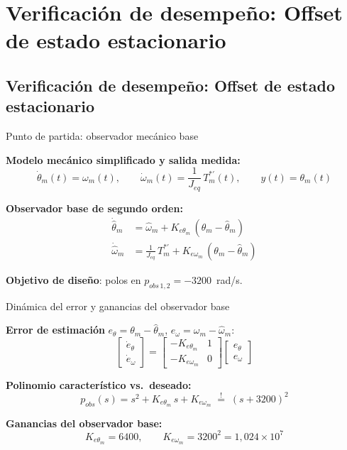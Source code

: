 \documentclass[aspectratio=169,t]{beamer}
\newcommand{\SecPresentacion}{Presentación del problema}
\newcommand{\SecMecanico}{Subsistema mecánico equivalente}
\newcommand{\SecElectromagnetico}{Subsistema electromagnético en coordenadas qd0}
\newcommand{\SecTermico}{Subsistema térmico}
\newcommand{\SecNLGlobal}{Sistema No Lineal Global}
\newcommand{\SecLPV}{Linealización Jacobiana (LPV)}
\newcommand{\SecLTI}{Obtención del modelo LTI equivalente}
\newcommand{\SecAnalisisLTI}{Análisis del modelo LTI aumentado}
\newcommand{\SecDinamica}{Respuesta dinámica en dominio del tiempo}
\newcommand{\SecControlador}{Diseño y análisis del controlador en cascada}
\newcommand{\SecVerifSpecs}{Verificación de desempeño: Especificaciones de operación}
\newcommand{\SecVerifOffset}{Verificación de desempeño: Offset de estado estacionario}
\newcommand{\SecVerifNoIdealidades}{Verificación de desempeño: No idealidades y comportamiento térmico}
\newcommand{\SecDiscretizacion}{Discretización del controlador}
\newcommand{\SecSoftware}{Codificación del software de control}
\newcommand{\AgendaItem}[3]{%
  \ifnum#1=#2
    {\scriptsize\bfseries\color{uncBlue}%
      \hyperlink{sec:#1}{\makebox[2.2em][r]{#1.}\hspace{0.7em}%
      \parbox[t]{0.86\textwidth}{#3}}\par}%
  \else
    {\scriptsize\color{black!26}%
      \hyperlink{sec:#1}{\makebox[2.2em][r]{#1.}\hspace{0.7em}%
      \parbox[t]{0.86\textwidth}{#3}}\par}%
  \fi
  \vspace{0.35mm}%
}
\newcommand{\AgendaBody}[1]{%
    \vspace{3mm}
    {\Large\bfseries\color{uncBlue}Tabla de contenidos\par}
    \vspace{2mm}
    \begin{minipage}{0.94\textwidth}
      \AgendaItem{1}{#1}{\SecPresentacion}
      \AgendaItem{2}{#1}{\SecMecanico}
      \AgendaItem{3}{#1}{\SecElectromagnetico}
      \AgendaItem{4}{#1}{\SecTermico}
      \AgendaItem{5}{#1}\SecNLGlobal
      \AgendaItem{6}{#1}{\SecLPV}
      \AgendaItem{7}{#1}{\SecLTI}
      \AgendaItem{8}{#1}{\SecAnalisisLTI}
      \AgendaItem{9}{#1}{\SecDinamica}
      \AgendaItem{10}{#1}{\SecControlador}
      \AgendaItem{11}{#1}{\SecVerifSpecs}
      \AgendaItem{12}{#1}{\SecVerifOffset}
      \AgendaItem{13}{#1}{\SecVerifNoIdealidades}
      \AgendaItem{14}{#1}{\SecDiscretizacion}
      \AgendaItem{15}{#1}{\SecSoftware}
    \end{minipage}
    \vfill
}
\newcommand{\AgendaSlideTarget}[2]{%
  \begin{frame}[plain]
    \hypertarget{#2}{}%
    \AgendaBody{#1}
  \end{frame}
}
\newcommand{\StartProjectSection}[2]{%
  \section{#2}%
  \subsection{#2}%
  \AgendaSlideTarget{#1}{sec:#1}%
}
\begin{document}
\StartProjectSection{12}{\SecVerifOffset}

\begin{frame}{Punto de partida: observador mecánico base}
\vspace{3mm}

\textbf{Modelo mecánico simplificado y salida medida:}
\begin{equation*}
\dot\theta_m(t) = \omega_m(t),
\qquad
\dot \omega_m(t) = \frac{1}{J_{eq}}\,T_m^{*\prime}(t),
\qquad
y(t) = \theta_m(t)
\end{equation*}

\textbf{Observador base de segundo orden:}
\begin{align*}
\dot{\hat{\theta}}_m &= \hat{\omega}_m + K_{e\theta_m}\,(\theta_m - \hat{\theta}_m) \\[3pt]
\dot{\hat{\omega}}_m &= \tfrac{1}{J_{eq}}\,T_m^{*\prime} + K_{e\omega_m}\,(\theta_m - \hat{\theta}_m)
\end{align*}

\vspace{2mm}
{\small \textbf{Objetivo de diseño}: polos en $p_{obs\,1,2}=-3200$~rad/s.}
\end{frame}

\begin{frame}{Dinámica del error y ganancias del observador base}
\vspace{3mm}

\textbf{Error de estimación} $e_\theta = \theta_m - \hat{\theta}_m$, $e_\omega = \omega_m - \hat{\omega}_m$:
\begin{equation*}
\begin{bmatrix}\dot{e}_\theta\\[2pt] \dot{e}_\omega\end{bmatrix}
=
\begin{bmatrix}-K_{e\theta_m} & 1\\ -K_{e\omega_m} & 0\end{bmatrix}
\begin{bmatrix}e_\theta\\[2pt] e_\omega\end{bmatrix}
\end{equation*}

\textbf{Polinomio característico vs.\ deseado:}
\begin{equation*}
p_{obs}(s) = s^{2} + K_{e\theta_m}\,s + K_{e\omega_m} \;\overset{!}{=}\; (s+3200)^{2}
\end{equation*}

\textbf{Ganancias del observador base:}
\begin{equation*}
K_{e\theta_m} = 6400,
\qquad
K_{e\omega_m} = 3200^{2} = 1{,}024\times 10^{7}
\end{equation*}
\end{frame}
\end{document}
